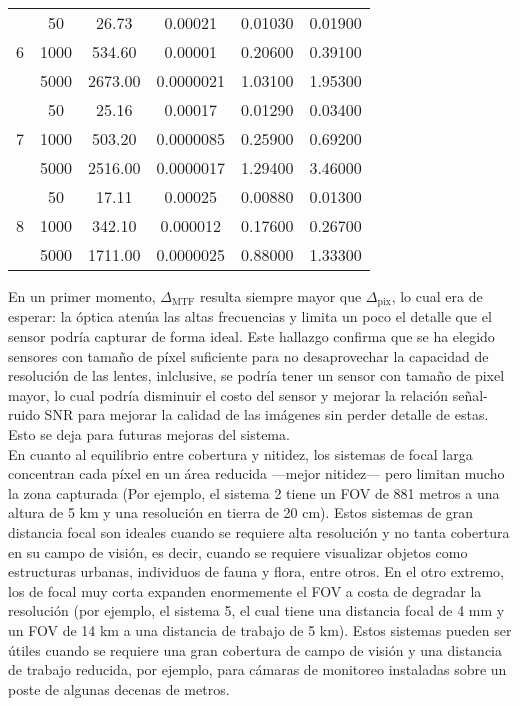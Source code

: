 \begin{table}[h]
\begin{tabular}{|c|c|c|c|c|c|}
        \multirow{3}{*}{6}
         & 50   & 26.73  & 0.00021   & 0.01030  & 0.01900   \\ 
         & 1000 & 534.60 & 0.00001   & 0.20600  & 0.39100   \\ 
         & 5000 & 2673.00& 0.0000021   & 1.03100  & 1.95300   \\ 
        \hline
        
        \multirow{3}{*}{7}
         & 50   & 25.16  & 0.00017   & 0.01290  & 0.03400   \\ 
         & 1000 & 503.20 & 0.0000085   & 0.25900  & 0.69200   \\ 
         & 5000 & 2516.00& 0.0000017   & 1.29400  & 3.46000   \\ 
        \hline
        
        \multirow{3}{*}{8}
         & 50   & 17.11  & 0.00025   & 0.00880  & 0.01300   \\ 
         & 1000 & 342.10 & 0.000012   & 0.17600  & 0.26700   \\ 
         & 5000 & 1711.00& 0.0000025   & 0.88000  & 1.33300   \\ 
        \hline
    \end{tabular}
\end{table}




\noindent En un primer momento, \(\Delta_{\mathrm{MTF}}\) resulta siempre mayor que \(\Delta_{\mathrm{pix}}\), lo cual era de esperar: la óptica atenúa las altas frecuencias y limita un poco el detalle que el sensor podría capturar de forma ideal. Este hallazgo confirma que se ha elegido sensores con tamaño de píxel suficiente para no desaprovechar la capacidad de resolución de las lentes, inlclusive, se podría tener un sensor con tamaño de pixel mayor, lo cual podría disminuir el costo del sensor y mejorar la relación señal-ruido SNR para mejorar la calidad de las imágenes sin perder detalle de estas. Esto se deja para futuras mejoras del sistema.\\

\noindent En cuanto al equilibrio entre cobertura y nitidez, los sistemas de focal larga concentran cada píxel en un área reducida —mejor nitidez— pero limitan mucho la zona capturada (Por ejemplo, el sistema 2 tiene un FOV de 881 metros a una altura de 5 km y una resolución en tierra de 20 cm). Estos sistemas de gran distancia focal son ideales cuando se requiere alta resolución y no tanta cobertura en su campo de visión, es decir, cuando se requiere visualizar objetos como estructuras urbanas, individuos de fauna y flora, entre otros. En el otro extremo, los de focal muy corta expanden enormemente el FOV a costa de degradar la resolución (por ejemplo, el sistema 5, el cual tiene una distancia focal de 4 mm y un FOV de 14 km a una distancia de trabajo de 5 km). Estos sistemas pueden ser útiles cuando se requiere una gran cobertura de campo de visión y una distancia de trabajo reducida, por ejemplo, para cámaras de monitoreo instaladas sobre un poste de algunas decenas de metros.\\

